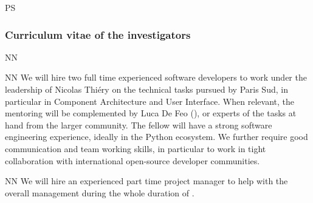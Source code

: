 \begin{sitedescription}{PS}

\subsubsection*{Curriculum vitae of the investigators}


%





\begin{participant}[type=res,PM=48,salary=5500]{NN}
\end{participant}
\begin{participant}[type=res,PM=36,salary=5500]{NN}
  We will hire two full time experienced software developers to work
  under the leadership of Nicolas Thiéry on the technical tasks
  pursued by Paris Sud, in particular in
   Component Architecture and 
  User Interface. When relevant, the mentoring will be complemented by
  Luca De Feo (), or experts of the tasks at hand from the
  larger community.
  The fellow will have a strong software engineering experience,
  ideally in the Python ecosystem. We further require good
  communication and team working skills, in particular to work in
  tight collaboration with international open-source developer
  communities.
\end{participant}


\begin{participant}[type=res,PM=24,salary=3932]{NN}
  We will hire an experienced part time project manager to help with
  the overall management during the whole duration of \TheProject.
\end{participant}



\end{sitedescription}
